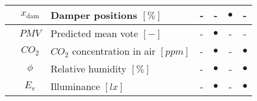 \documentclass[10pt]{extarticle}
\begin{document}
\begin{table}[ht]
\begin{adjustwidth}{-1cm}{}
\begin{tabular}{l|c|l|cccc}
		& $x_{\text{dam}}$ & Damper positions $[\%]$ & - & - & $\bullet$ & - \\
		\midrule
		 &
		$PMV$ & Predicted mean vote $[-]$ & - & $\bullet$ & - & - \\
		& $CO_2$ & $CO_2$ concentration in air $[ppm]$ & - & $\bullet$ & - & $\bullet$ \\
		& $\phi$ & Relative humidity  $[\%]$ & - & $\bullet$ & - & $\bullet$ \\
		& $E_{\text{v}}$ & Illuminance $[lx]$ & - & $\bullet$ & - & $\bullet$ \\
		\bottomrule 
	\end{tabular}
	 \end{adjustwidth}
\end{table} 
\end{document}
